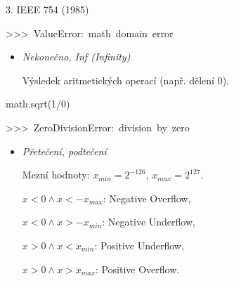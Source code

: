 \documentclass[czech]{beamer}
\newenvironment{lyxcode}
  {\par\begin{list}{}{
    \setlength{\rightmargin}{\leftmargin}
    \setlength{\listparindent}{0pt}%
    \raggedright
    \setlength{\itemsep}{0pt}
    \setlength{\parsep}{0pt}
    \normalfont\ttfamily}%
   \def\{{\char`\{}
   \def\}{\char`\}}
   \def\textasciitilde{\char`\~}
   \item[]}
  {\end{list}}
\begin{document}
\begin{frame}[plain]{3. IEEE 754 (1985)}
\begin{lyxcode}
{\tiny >\textcompwordmark >\textcompwordmark >~ValueError:~math~domain~error}{\tiny\par}
\end{lyxcode}
\begin{itemize}
\item {\tiny\emph{Nekonečno, Inf (Infinity)}}{\tiny\par}

{\tiny Výsledek aritmetických operací (např. dělení 0).}{\tiny\par}

\end{itemize}
\begin{lyxcode}
{\tiny math.sqrt(1/0)~}{\tiny\par}

{\tiny >\textcompwordmark >\textcompwordmark >~ZeroDivisionError:~division~by~zero}{\tiny\par}
\end{lyxcode}
\begin{itemize}
\item {\tiny\emph{Přetečení, podtečení}}{\tiny\par}

{\tiny Mezní hodnoty: $x_{min}=2^{-126}$, $x_{max}=2^{127}$.\medskip{}
}{\tiny\par}

{\tiny$x<0\wedge x<-x_{max}$: Negative Overflow,}{\tiny\par}

{\tiny$x<0\wedge x>-x_{min}$: Negative Underflow,}{\tiny\par}

{\tiny$x>0\wedge x<x_{min}$: Positive Underflow,}{\tiny\par}

{\tiny$x>0\wedge x>x_{max}$: Positive Overflow.}{\tiny\par}
\end{itemize}
\end{frame}
\end{document}
